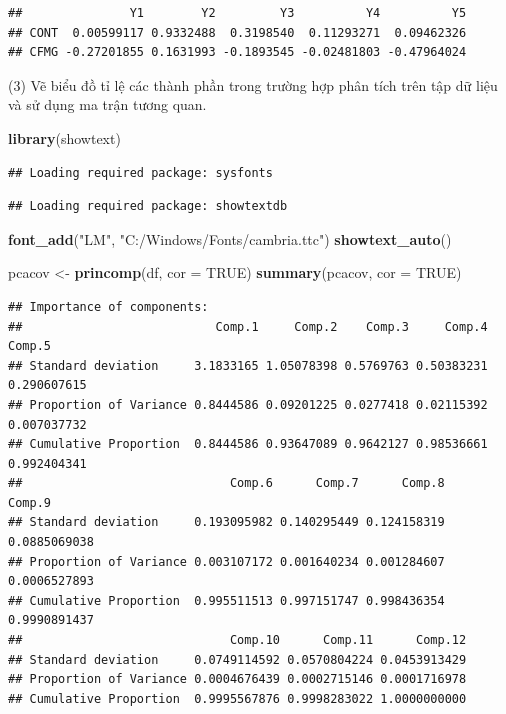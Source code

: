 \documentclass[
]{article}
\newenvironment{Shaded}{\begin{snugshade}}{\end{snugshade}}
\newcommand{\AttributeTok}[1]{\textcolor[rgb]{0.13,0.29,0.53}{#1}}
\newcommand{\ConstantTok}[1]{\textcolor[rgb]{0.56,0.35,0.01}{#1}}
\newcommand{\FunctionTok}[1]{\textcolor[rgb]{0.13,0.29,0.53}{\textbf{#1}}}
\newcommand{\NormalTok}[1]{#1}
\newcommand{\OtherTok}[1]{\textcolor[rgb]{0.56,0.35,0.01}{#1}}
\newcommand{\StringTok}[1]{\textcolor[rgb]{0.31,0.60,0.02}{#1}}
\begin{document}
\begin{verbatim}
##               Y1        Y2         Y3          Y4          Y5
## CONT  0.00599117 0.9332488  0.3198540  0.11293271  0.09462326
## CFMG -0.27201855 0.1631993 -0.1893545 -0.02481803 -0.47964024
\end{verbatim}

\hfill\break
(3) Vẽ biểu đồ tỉ lệ các thành phần trong trường hợp phân tích trên tập
dữ liệu và sử dụng ma trận tương quan.

\begin{Shaded}
\begin{Highlighting}[]
\FunctionTok{library}\NormalTok{(showtext)}
\end{Highlighting}
\end{Shaded}

\begin{verbatim}
## Loading required package: sysfonts
\end{verbatim}

\begin{verbatim}
## Loading required package: showtextdb
\end{verbatim}

\begin{Shaded}
\begin{Highlighting}[]
\FunctionTok{font\_add}\NormalTok{(}\StringTok{"LM"}\NormalTok{, }\StringTok{"C:/Windows/Fonts/cambria.ttc"}\NormalTok{)}
\FunctionTok{showtext\_auto}\NormalTok{()}

\NormalTok{pcacov }\OtherTok{\textless{}{-}} \FunctionTok{princomp}\NormalTok{(df, }\AttributeTok{cor =} \ConstantTok{TRUE}\NormalTok{)}
\FunctionTok{summary}\NormalTok{(pcacov, }\AttributeTok{cor =} \ConstantTok{TRUE}\NormalTok{)}
\end{Highlighting}
\end{Shaded}

\begin{verbatim}
## Importance of components:
##                           Comp.1     Comp.2    Comp.3     Comp.4      Comp.5
## Standard deviation     3.1833165 1.05078398 0.5769763 0.50383231 0.290607615
## Proportion of Variance 0.8444586 0.09201225 0.0277418 0.02115392 0.007037732
## Cumulative Proportion  0.8444586 0.93647089 0.9642127 0.98536661 0.992404341
##                             Comp.6      Comp.7      Comp.8       Comp.9
## Standard deviation     0.193095982 0.140295449 0.124158319 0.0885069038
## Proportion of Variance 0.003107172 0.001640234 0.001284607 0.0006527893
## Cumulative Proportion  0.995511513 0.997151747 0.998436354 0.9990891437
##                             Comp.10      Comp.11      Comp.12
## Standard deviation     0.0749114592 0.0570804224 0.0453913429
## Proportion of Variance 0.0004676439 0.0002715146 0.0001716978
## Cumulative Proportion  0.9995567876 0.9998283022 1.0000000000
\end{verbatim}
\end{document}
